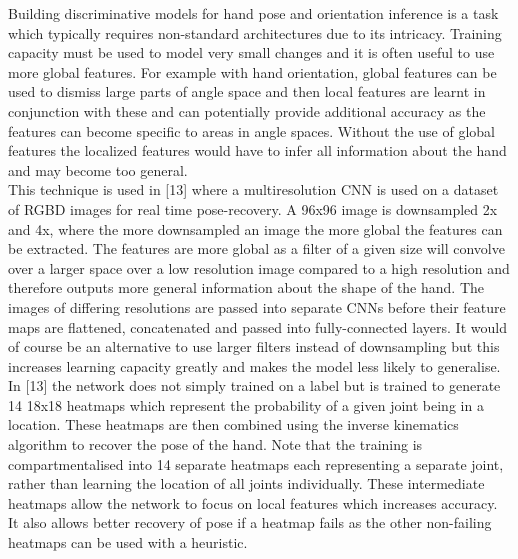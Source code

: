 \documentclass{article}
\begin{document}
Building discriminative models for hand pose and orientation inference is a task which typically requires non-standard architectures due to its intricacy. Training capacity must be used to model very small changes and it is often useful to use more global features. For example with hand orientation, global features can be used to dismiss large parts of angle space and then local features are learnt in conjunction with these and can potentially provide additional accuracy as the features can become specific to areas in angle spaces. Without the use of global features the localized features would have to infer all information about the hand and may become too general.\\

This technique is used in [13] where a multiresolution CNN is used on a dataset of RGBD images for real time pose-recovery. A 96x96 image is downsampled 2x and 4x, where the more downsampled an image the more global the features can be extracted. The features are more global as a filter of a given size will convolve over a larger space over a low resolution image compared to a high resolution and therefore outputs more general information about the shape of the hand. The images of differing resolutions are passed into separate CNNs before their feature maps are flattened, concatenated and passed into fully-connected layers. It would of course be an alternative to use larger filters instead of downsampling but this increases learning capacity greatly and makes the model less likely to generalise.\\

In [13] the network does not simply trained on a label but is trained to generate 14 18x18 heatmaps which represent the probability of a given joint being in a location. These heatmaps are then combined using the inverse kinematics algorithm to recover the pose of the hand. Note that the training is compartmentalised into 14 separate heatmaps each representing a separate joint, rather than learning the location of all joints individually. These intermediate heatmaps allow the network to focus on local features which increases accuracy. It also allows better recovery of pose if a heatmap fails as the other non-failing heatmaps can be used with a heuristic.\\
\end{document}
